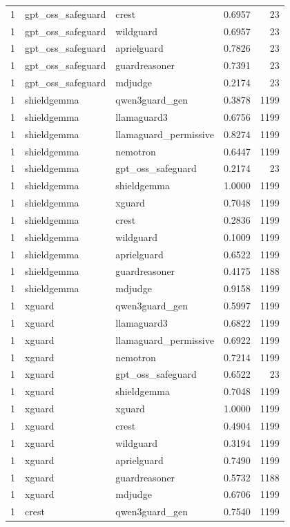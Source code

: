 \begin{tabular}{rllrr}
1 & gpt\_oss\_safeguard & crest & 0.6957 & 23 \\
1 & gpt\_oss\_safeguard & wildguard & 0.6957 & 23 \\
1 & gpt\_oss\_safeguard & aprielguard & 0.7826 & 23 \\
1 & gpt\_oss\_safeguard & guardreasoner & 0.7391 & 23 \\
1 & gpt\_oss\_safeguard & mdjudge & 0.2174 & 23 \\
1 & shieldgemma & qwen3guard\_gen & 0.3878 & 1199 \\
1 & shieldgemma & llamaguard3 & 0.6756 & 1199 \\
1 & shieldgemma & llamaguard\_permissive & 0.8274 & 1199 \\
1 & shieldgemma & nemotron & 0.6447 & 1199 \\
1 & shieldgemma & gpt\_oss\_safeguard & 0.2174 & 23 \\
1 & shieldgemma & shieldgemma & 1.0000 & 1199 \\
1 & shieldgemma & xguard & 0.7048 & 1199 \\
1 & shieldgemma & crest & 0.2836 & 1199 \\
1 & shieldgemma & wildguard & 0.1009 & 1199 \\
1 & shieldgemma & aprielguard & 0.6522 & 1199 \\
1 & shieldgemma & guardreasoner & 0.4175 & 1188 \\
1 & shieldgemma & mdjudge & 0.9158 & 1199 \\
1 & xguard & qwen3guard\_gen & 0.5997 & 1199 \\
1 & xguard & llamaguard3 & 0.6822 & 1199 \\
1 & xguard & llamaguard\_permissive & 0.6922 & 1199 \\
1 & xguard & nemotron & 0.7214 & 1199 \\
1 & xguard & gpt\_oss\_safeguard & 0.6522 & 23 \\
1 & xguard & shieldgemma & 0.7048 & 1199 \\
1 & xguard & xguard & 1.0000 & 1199 \\
1 & xguard & crest & 0.4904 & 1199 \\
1 & xguard & wildguard & 0.3194 & 1199 \\
1 & xguard & aprielguard & 0.7490 & 1199 \\
1 & xguard & guardreasoner & 0.5732 & 1188 \\
1 & xguard & mdjudge & 0.6706 & 1199 \\
1 & crest & qwen3guard\_gen & 0.7540 & 1199 \\

\end{tabular}
